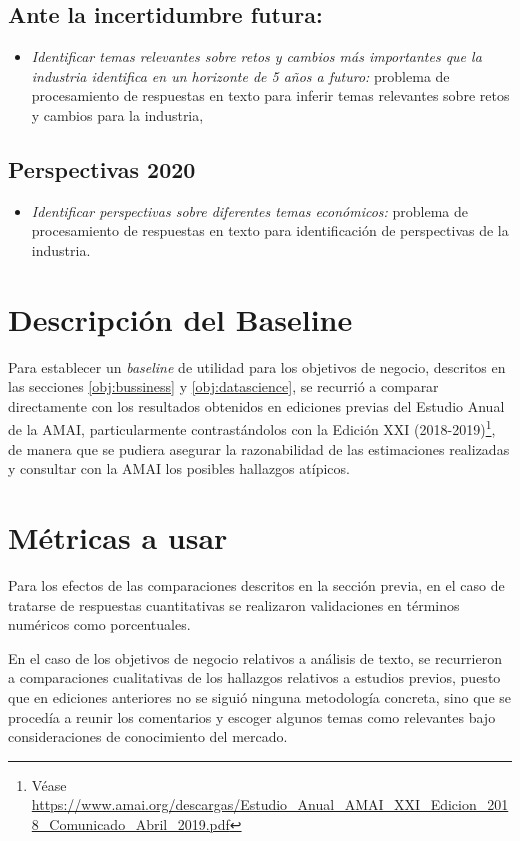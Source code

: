 \subsection{Ante la incertidumbre futura:}
\begin{itemize}
\item \textit{Identificar temas relevantes sobre retos y cambios más importantes que la industria identifica en un horizonte de 5 años a futuro:} problema de procesamiento de respuestas en texto para inferir temas relevantes sobre retos y cambios para la industria,
\end{itemize}

\subsection{Perspectivas 2020}
\begin{itemize}
\item \textit{Identificar perspectivas sobre diferentes temas económicos:} problema de procesamiento de respuestas en texto para identificación de perspectivas de la industria.
\end{itemize}

\section{Descripción del Baseline} \label{baseline}

Para establecer un \emph{baseline} de utilidad para los objetivos de negocio, descritos en las secciones \ref{obj:bussiness} y \ref{obj:datascience}, se recurrió a comparar directamente con los resultados obtenidos en ediciones previas del Estudio Anual de la AMAI, particularmente contrastándolos con la Edición XXI (2018-2019)\footnote{Véase \url{https://www.amai.org/descargas/Estudio_Anual_AMAI_XXI_Edicion_2018_Comunicado_Abril_2019.pdf}}, de manera que se pudiera asegurar la razonabilidad de las estimaciones realizadas y consultar con la AMAI los posibles hallazgos atípicos.

\section{Métricas a usar}

Para los efectos de las comparaciones descritos en la sección previa, en el caso de tratarse de respuestas cuantitativas se realizaron validaciones en términos numéricos como porcentuales.

En el caso de los objetivos de negocio relativos a análisis de texto, se recurrieron a comparaciones cualitativas de los hallazgos relativos a estudios previos, puesto que en ediciones anteriores no se siguió ninguna metodología concreta, sino que se procedía a reunir los comentarios y escoger algunos temas como relevantes bajo consideraciones de conocimiento del mercado.




